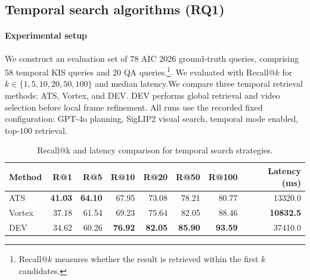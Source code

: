 \documentclass[runningheads]{llncs}
\begin{document}



\subsection{Temporal search algorithms (RQ1)}
\paragraph{Experimental setup} We construct an evaluation set of 78 AIC 2026 ground-truth queries,
comprising 58 temporal KIS queries and 20 QA queries.\footnote{Recall@$k$ measures whether the result is retrieved within the first $k$ candidates.}. We evaluated with Recall@$k$ for $k\in\{1,5,10,20,50,100\}$ and median latency.We compare three temporal retrieval methods: ATS, Vortex, and DEV. DEV performs global retrieval and video selection before local frame refinement. All runs use the recorded fixed configuration: GPT-4o planning, SigLIP2 visual search, temporal mode enabled, top-$100$ retrieval.


\begin{table}[t]
    \centering
    \caption{Recall@k and latency comparison for temporal search strategies.}
    \label{tab:temporal-recall}
    \small
    \setlength{\tabcolsep}{4pt}
    \begin{tabular}{lrrrrrrr}
        \toprule
        Method & R@1 & R@5 & R@10 & R@20 & R@50 & R@100 & Latency (ms) \\
        \midrule
        ATS
        & \textbf{41.03}
        & \textbf{64.10}
        & 67.95
        & 73.08
        & 78.21
        & 80.77
        & 13320.0 \\

        Vortex
        & 37.18
        & 61.54
        & 69.23
        & 75.64
        & 82.05
        & 88.46
        & \textbf{10832.5} \\

        DEV
        & 34.62
        & 60.26
        & \textbf{76.92}
        & \textbf{82.05}
        & \textbf{85.90}
        & \textbf{93.59}
        & 37410.0 \\
        \bottomrule
    \end{tabular}
\end{table}
\end{document}
